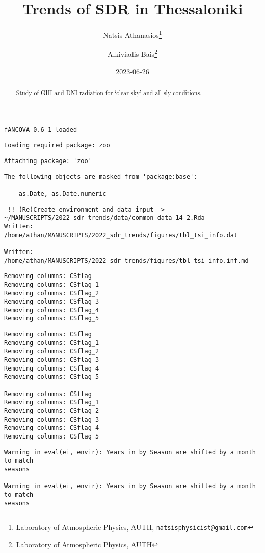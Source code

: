 \documentclass[
  10pt,
  a4paper,oneside]{article}
\title{Trends of SDR in Thessaloniki}
\author{Natsis Athanasios\footnote{Laboratory of Atmospheric Physics, AUTH, \href{mailto:natsisphysicist@gmail.com}{\nolinkurl{natsisphysicist@gmail.com}}} \and Alkiviadis Bais\footnote{Laboratory of Atmospheric Physics, AUTH}}
\date{2023-06-26}
\begin{document}
\maketitle
\begin{abstract}
Study of GHI and DNI radiation for `clear sky' and all sly conditions.
\end{abstract}

{
\hypersetup{linkcolor=}
\setcounter{tocdepth}{4}
\tableofcontents
}
\begin{verbatim}
fANCOVA 0.6-1 loaded
\end{verbatim}

\begin{verbatim}
Loading required package: zoo
\end{verbatim}

\begin{verbatim}
Attaching package: 'zoo'
\end{verbatim}

\begin{verbatim}
The following objects are masked from 'package:base':

    as.Date, as.Date.numeric
\end{verbatim}

\begin{verbatim}
 !! (Re)Create environment and data input -> ~/MANUSCRIPTS/2022_sdr_trends/data/common_data_14_2.Rda 
Written:  /home/athan/MANUSCRIPTS/2022_sdr_trends/figures/tbl_tsi_info.dat 

Written:  /home/athan/MANUSCRIPTS/2022_sdr_trends/figures/tbl_tsi_info.inf.md 
\end{verbatim}

\begin{verbatim}
Removing columns: CSflag
Removing columns: CSflag_1
Removing columns: CSflag_2
Removing columns: CSflag_3
Removing columns: CSflag_4
Removing columns: CSflag_5
\end{verbatim}

\begin{verbatim}
Removing columns: CSflag
Removing columns: CSflag_1
Removing columns: CSflag_2
Removing columns: CSflag_3
Removing columns: CSflag_4
Removing columns: CSflag_5

Removing columns: CSflag
Removing columns: CSflag_1
Removing columns: CSflag_2
Removing columns: CSflag_3
Removing columns: CSflag_4
Removing columns: CSflag_5
\end{verbatim}

\begin{verbatim}
Warning in eval(ei, envir): Years in by Season are shifted by a month to match
seasons

Warning in eval(ei, envir): Years in by Season are shifted by a month to match
seasons
\end{verbatim}
\end{document}
